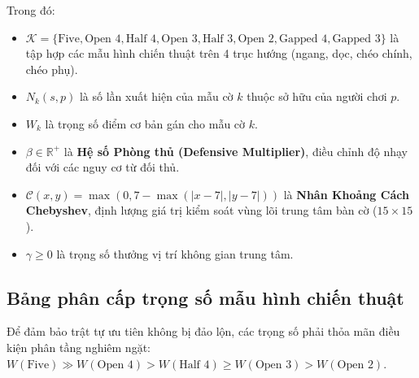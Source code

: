 \documentclass[11pt,a4paper]{article}
\begin{document}
Trong đó:
\begin{itemize}
    \item $\mathcal{K} = \{\text{Five}, \text{Open 4}, \text{Half 4}, \text{Open 3}, \text{Half 3}, \text{Open 2}, \text{Gapped 4}, \text{Gapped 3}\}$ là tập hợp các mẫu hình chiến thuật trên 4 trục hướng (ngang, dọc, chéo chính, chéo phụ).
    \item $N_k(s, p)$ là số lần xuất hiện của mẫu cờ $k$ thuộc sở hữu của người chơi $p$.
    \item $W_k$ là trọng số điểm cơ bản gán cho mẫu cờ $k$.
    \item $\beta \in \mathbb{R}^+$ là \textbf{Hệ số Phòng thủ (Defensive Multiplier)}, điều chỉnh độ nhạy đối với các nguy cơ từ đối thủ.
    \item $\mathcal{C}(x, y) = \max\left(0, 7 - \max(|x - 7|, |y - 7|)\right)$ là \textbf{Nhân Khoảng Cách Chebyshev}, định lượng giá trị kiểm soát vùng lõi trung tâm bàn cờ ($15 \times 15$).
    \item $\gamma \ge 0$ là trọng số thưởng vị trí không gian trung tâm.
\end{itemize}

\subsection{Bảng phân cấp trọng số mẫu hình chiến thuật}
Để đảm bảo trật tự ưu tiên không bị đảo lộn, các trọng số phải thỏa mãn điều kiện phân tầng nghiêm ngặt: $W(\text{Five}) \gg W(\text{Open 4}) > W(\text{Half 4}) \ge W(\text{Open 3}) > W(\text{Open 2})$.
\end{document}
